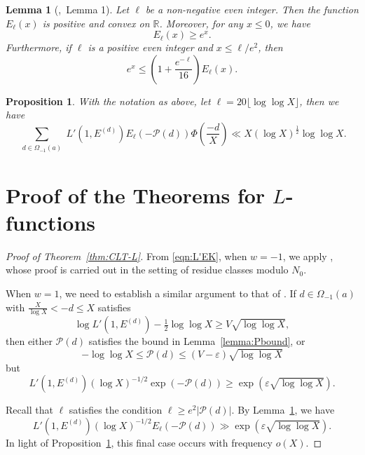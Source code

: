 \documentclass[12pt,reqno]{amsart}
\numberwithin{equation}{section}
\theoremstyle{plain}
\newtheorem{lemma}[theorem]{Lemma}
\newtheorem{proposition}[theorem]{Proposition}
\theoremstyle{definition}
\theoremstyle{remark}
\begin{document}
\begin{lemma}[\cite{RadziwillSoundararajan2015},~Lemma 1]\label{lemma:el}
Let \( \ell \) be a non-negative even integer. Then the function \( E_{\ell}(x) \) is positive and convex on \( \mathbb{R} \). Moreover, for any \( x \leq 0 \), we have
\[
E_{\ell}(x) \geq e^{x}.
\]
Furthermore, if \( \ell \) is a positive even integer and \( x \leq \ell / e^2 \), then
\[
e^{x} \leq \left( 1 + \frac{e^{-\ell}}{16} \right) E_{\ell}(x).
\]
\end{lemma}

\begin{proposition}\label{prop:bound}
With the notation as above, let \( \ell = 20 \lfloor \log \log X \rfloor \), then we have
\begin{equation*}
\sum_{\substack{d \in \Omega_{-1}(a)}}
L'(1, E^{(d)})
E_{\ell}(-\mathcal{P}(d))
\Phi\left(\frac{-d}{X}\right)
\ll X (\log X)^{\frac{1}{2}}\log \log X.
\end{equation*}
\end{proposition}

\section{Proof of the Theorems for \texorpdfstring{$L$}{L}-functions}\label{sec:proof}

\begin{proof}[Proof of Theorem~\ref{thm:CLT-L}]
From \eqref{eqn:L'EK}, when \( w = -1 \),
we apply \cite[Theorem~2]{RadziwillSoundararajan2015}, whose proof is carried out in the setting of residue classes modulo $N_0$.

When $w=1$, we need to establish a similar argument to that of \cite[Theorem~2]{RadziwillSoundararajan2015}.
If \( d \in \Omega_{-1}(a) \) with \( \frac{X}{\log X} < -d \leq X \) satisfies
\[
\log L'(1, E^{(d)}) - \tfrac{1}{2} \log \log X \geq V \sqrt{\log \log X},
\]
then either \( \mathcal{P}(d) \) satisfies the bound in Lemma~\ref{lemma:Pbound}, or
\[
- \log \log X \leq \mathcal{P}(d) \leq (V - \varepsilon ) \sqrt{\log \log X}
\]
but
\[
L'(1, E^{(d)}) (\log X)^{-1/2} \exp(-\mathcal{P}(d)) \geq \exp(\varepsilon \sqrt{\log \log X}).
\]

Recall that \( \ell \) satisfies the condition \( \ell \geq e^2 \left| \mathcal{P}(d) \right| \).
By Lemma~\ref{lemma:el}, we have
\[
L'(1, E^{(d)}) (\log X)^{-1/2} E_\ell (-\mathcal{P}(d)) \gg \exp(\varepsilon \sqrt{\log \log X}).
\]
In light of Proposition~\ref{prop:bound}, this final case occurs with frequency \( o(X) \).
\end{proof}
\end{document}
